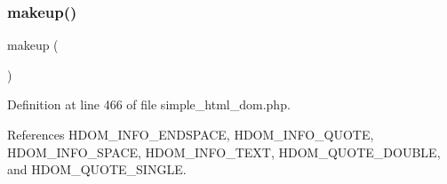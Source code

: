 \subsubsection{\texorpdfstring{makeup()}{makeup()}}
{\footnotesize\ttfamily makeup (\begin{DoxyParamCaption}{ }\end{DoxyParamCaption})}



Definition at line 466 of file simple\+\_\+html\+\_\+dom.\+php.



References H\+D\+O\+M\+\_\+\+I\+N\+F\+O\+\_\+\+E\+N\+D\+S\+P\+A\+CE, H\+D\+O\+M\+\_\+\+I\+N\+F\+O\+\_\+\+Q\+U\+O\+TE, H\+D\+O\+M\+\_\+\+I\+N\+F\+O\+\_\+\+S\+P\+A\+CE, H\+D\+O\+M\+\_\+\+I\+N\+F\+O\+\_\+\+T\+E\+XT, H\+D\+O\+M\+\_\+\+Q\+U\+O\+T\+E\+\_\+\+D\+O\+U\+B\+LE, and H\+D\+O\+M\+\_\+\+Q\+U\+O\+T\+E\+\_\+\+S\+I\+N\+G\+LE.


